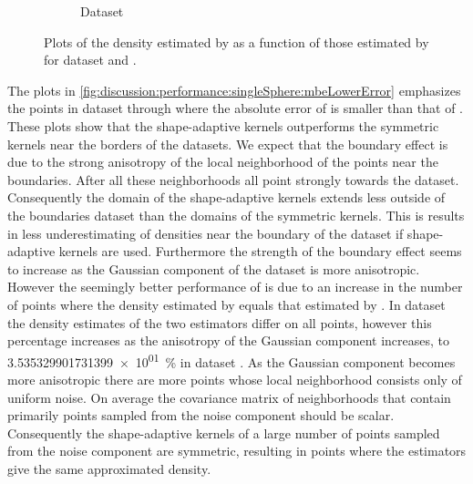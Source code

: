 \begin{figure}
\begin{subfigure}{0.23\textwidth}
				\caption{Dataset \baakmanThree}
				\label{fig:discussion:performance:mbevssambe:baakman3}
			\end{subfigure}	
			\caption{Plots of the density estimated by \sambe as a function of those estimated by \mbe for dataset %
				\ferdosiThree and %
				\baakmanThree.
			}
			\label{fig:discussion:performance:four:mbevssambe}
		\end{figure}

	The plots in \cref{fig:discussion:performance:singleSphere:mbeLowerError} emphasizes the points in dataset \ferdosiOne through \baakmanOne where the absolute error of \mbe is smaller than that of \sambe. These plots show that the shape-adaptive kernels outperforms the symmetric kernels near the borders of the datasets.
		We expect that the boundary effect is due to the strong anisotropy of the local neighborhood of the points near the boundaries. After all these neighborhoods all point strongly towards the dataset. Consequently the domain of the shape-adaptive kernels extends less outside of the boundaries dataset than the domains of the symmetric kernels. This is results in less underestimating of densities near the boundary of the dataset if shape-adaptive kernels are used.
		Furthermore the strength of the boundary effect seems to increase as the Gaussian component of the dataset is more anisotropic. However the seemingly better performance of \sambe is due to an increase in the number of points where the density estimated by \sambe equals that estimated by \mbe. In dataset \ferdosiOne the density estimates of the two estimators differ on all points, however this percentage increases as the anisotropy of the Gaussian component increases, to \SI{3.535329901731399e+01}{\percent} in dataset \baakmanFive. 
		As the Gaussian component becomes more anisotropic there are more points whose local neighborhood consists only of uniform noise. On average the covariance matrix of neighborhoods that contain primarily points sampled from the noise component should be scalar. Consequently the shape-adaptive kernels of a large number of points sampled from the noise component are symmetric, resulting in points where the estimators give the same approximated density.
	
